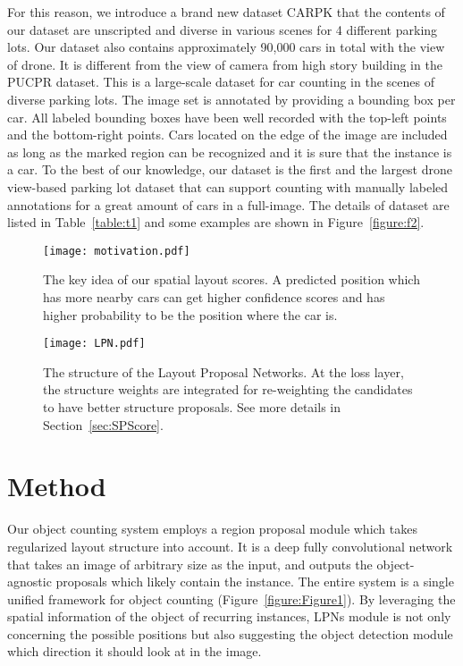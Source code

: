 \documentclass[10pt,twocolumn,letterpaper]{article}
\begin{document}
For this reason, we introduce a brand new dataset CARPK that the contents of our dataset are unscripted and diverse in various scenes for 4 different parking lots. Our dataset also contains approximately 90,000 cars in total with the view of drone.
It is different from the view of camera from high story building in the PUCPR dataset. This is a large-scale dataset for car counting in the scenes of diverse parking lots. The image set is annotated by providing a bounding box per car. All labeled bounding boxes have been well recorded with the top-left points and the bottom-right points. Cars located on the edge of the image are included as long as the marked region can be recognized and it is sure that the instance is a car. To the best of our knowledge, our dataset is the first and the largest drone view-based parking lot dataset that can support counting with manually labeled annotations for a great amount of cars in a full-image. The details of dataset are listed in Table~\ref{table:t1} and some examples are shown in Figure~\ref{figure:f2}.

\begin{figure}[t]
\begin{center}
   \texttt{[image: motivation.pdf]}
\end{center}
   \caption{The key idea of our spatial layout scores. A predicted position which has more nearby cars can get higher confidence scores and has higher probability to be the position where the car is.}
\label{figure:SPScore}
\end{figure}

\begin{figure*}[th]
\begin{center}
   \texttt{[image: LPN.pdf]}
\end{center}
   \caption{The structure of the Layout Proposal Networks.
At the loss layer, the structure weights are integrated for re-weighting the candidates to have better structure proposals. See more details in Section~\ref{sec:SPScore}.}
\label{figure:LPN}
\end{figure*}

\section{Method}

Our object counting system employs a region proposal module which takes regularized layout structure into account. It is a deep fully convolutional network that takes an image of arbitrary size as the input, and outputs the object-agnostic proposals which likely contain the instance. The entire system is a single unified framework for object counting (Figure~\ref{figure:Figure1}). By leveraging the spatial information of the object of recurring instances, LPNs module is not only concerning the possible positions but also suggesting the object detection module which direction it should look at in the image.
\end{document}
